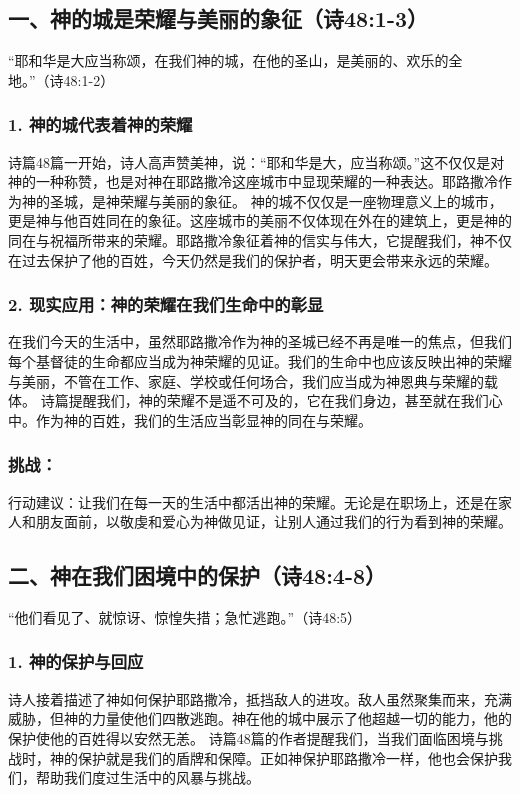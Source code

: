 \documentclass[a4paper, 12pt]{article}
\begin{document}
\subsection*{一、神的城是荣耀与美丽的象征（诗48:1-3）}
“耶和华是大应当称颂，在我们神的城，在他的圣山，是美丽的、欢乐的全地。”（诗48:1-2）

\subsubsection*{1. 神的城代表着神的荣耀}
诗篇48篇一开始，诗人高声赞美神，说：“耶和华是大，应当称颂。”这不仅仅是对神的一种称赞，也是对神在耶路撒冷这座城市中显现荣耀的一种表达。耶路撒冷作为神的圣城，是神荣耀与美丽的象征。
神的城不仅仅是一座物理意义上的城市，更是神与他百姓同在的象征。这座城市的美丽不仅体现在外在的建筑上，更是神的同在与祝福所带来的荣耀。耶路撒冷象征着神的信实与伟大，它提醒我们，神不仅在过去保护了他的百姓，今天仍然是我们的保护者，明天更会带来永远的荣耀。
\subsubsection*{2. 现实应用：神的荣耀在我们生命中的彰显}
在我们今天的生活中，虽然耶路撒冷作为神的圣城已经不再是唯一的焦点，但我们每个基督徒的生命都应当成为神荣耀的见证。我们的生命中也应该反映出神的荣耀与美丽，不管在工作、家庭、学校或任何场合，我们应当成为神恩典与荣耀的载体。
诗篇提醒我们，神的荣耀不是遥不可及的，它在我们身边，甚至就在我们心中。作为神的百姓，我们的生活应当彰显神的同在与荣耀。
\subsubsection*{挑战：}

行动建议：让我们在每一天的生活中都活出神的荣耀。无论是在职场上，还是在家人和朋友面前，以敬虔和爱心为神做见证，让别人通过我们的行为看到神的荣耀。
\subsection*{二、神在我们困境中的保护（诗48:4-8）}
“他们看见了、就惊讶、惊惶失措；急忙逃跑。”（诗48:5）

\subsubsection*{1. 神的保护与回应}
诗人接着描述了神如何保护耶路撒冷，抵挡敌人的进攻。敌人虽然聚集而来，充满威胁，但神的力量使他们四散逃跑。神在他的城中展示了他超越一切的能力，他的保护使他的百姓得以安然无恙。
诗篇48篇的作者提醒我们，当我们面临困境与挑战时，神的保护就是我们的盾牌和保障。正如神保护耶路撒冷一样，他也会保护我们，帮助我们度过生活中的风暴与挑战。
\end{document}
